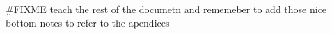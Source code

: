 

#FIXME teach the rest of the documetn and rememeber to add those nice bottom notes to refer to the apendices
